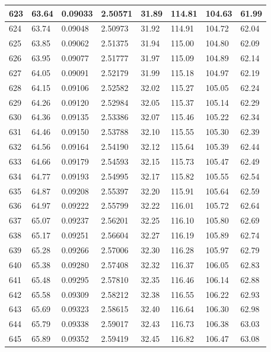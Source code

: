 \documentclass[12pt,a4paper,twoside]{article}
\begin{document}
\begin{center}
\begin{longtable}{l l l l | l l l l}
623 & 63.64 & 0.09033 & 2.50571 & 31.89 & 114.81 & 104.63 & 61.99 \\ \hline
624 & 63.74 & 0.09048 & 2.50973 & 31.92 & 114.91 & 104.72 & 62.04 \\ \hline
625 & 63.85 & 0.09062 & 2.51375 & 31.94 & 115.00 & 104.80 & 62.09 \\ \hline
626 & 63.95 & 0.09077 & 2.51777 & 31.97 & 115.09 & 104.89 & 62.14 \\ \hline
627 & 64.05 & 0.09091 & 2.52179 & 31.99 & 115.18 & 104.97 & 62.19 \\ \hline
628 & 64.15 & 0.09106 & 2.52582 & 32.02 & 115.27 & 105.05 & 62.24 \\ \hline
629 & 64.26 & 0.09120 & 2.52984 & 32.05 & 115.37 & 105.14 & 62.29 \\ \hline
630 & 64.36 & 0.09135 & 2.53386 & 32.07 & 115.46 & 105.22 & 62.34 \\ \hline
631 & 64.46 & 0.09150 & 2.53788 & 32.10 & 115.55 & 105.30 & 62.39 \\ \hline
632 & 64.56 & 0.09164 & 2.54190 & 32.12 & 115.64 & 105.39 & 62.44 \\ \hline
633 & 64.66 & 0.09179 & 2.54593 & 32.15 & 115.73 & 105.47 & 62.49 \\ \hline
634 & 64.77 & 0.09193 & 2.54995 & 32.17 & 115.82 & 105.55 & 62.54 \\ \hline
635 & 64.87 & 0.09208 & 2.55397 & 32.20 & 115.91 & 105.64 & 62.59 \\ \hline
636 & 64.97 & 0.09222 & 2.55799 & 32.22 & 116.01 & 105.72 & 62.64 \\ \hline
637 & 65.07 & 0.09237 & 2.56201 & 32.25 & 116.10 & 105.80 & 62.69 \\ \hline
638 & 65.17 & 0.09251 & 2.56604 & 32.27 & 116.19 & 105.89 & 62.74 \\ \hline
639 & 65.28 & 0.09266 & 2.57006 & 32.30 & 116.28 & 105.97 & 62.79 \\ \hline
640 & 65.38 & 0.09280 & 2.57408 & 32.32 & 116.37 & 106.05 & 62.83 \\ \hline
641 & 65.48 & 0.09295 & 2.57810 & 32.35 & 116.46 & 106.14 & 62.88 \\ \hline
642 & 65.58 & 0.09309 & 2.58212 & 32.38 & 116.55 & 106.22 & 62.93 \\ \hline
643 & 65.69 & 0.09323 & 2.58615 & 32.40 & 116.64 & 106.30 & 62.98 \\ \hline
644 & 65.79 & 0.09338 & 2.59017 & 32.43 & 116.73 & 106.38 & 63.03 \\ \hline
645 & 65.89 & 0.09352 & 2.59419 & 32.45 & 116.82 & 106.47 & 63.08 \\ \hline

\end{longtable}
\end{center}
\end{document}
